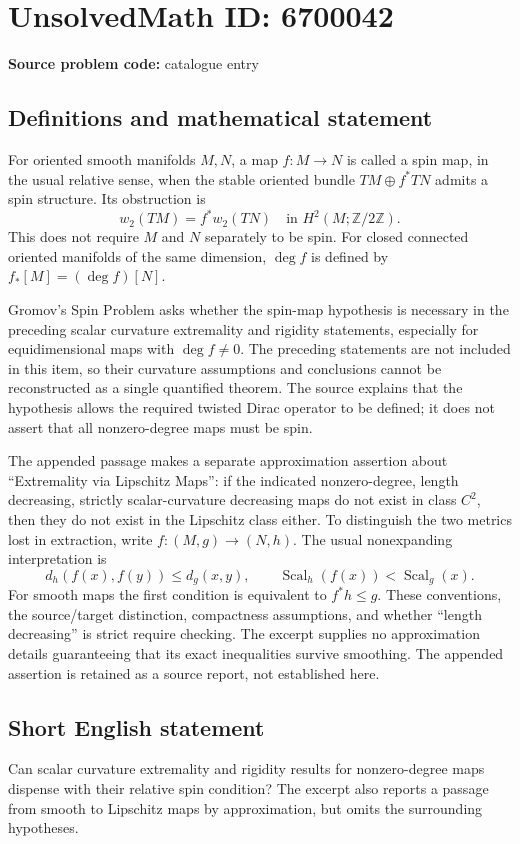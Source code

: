 \documentclass[11pt]{article}
\newcommand{\Z}{\mathbb{Z}}
\begin{document}
\section*{UnsolvedMath ID: 6700042}
\textbf{Source problem code:} catalogue entry
\subsection{Definitions and mathematical statement}
For oriented smooth manifolds \(M,N\), a map \(f:M\to N\) is called a spin map, in the usual relative sense, when the stable oriented bundle \(TM\oplus f^*TN\) admits a spin structure. Its obstruction is
\[
 w_2(TM)=f^*w_2(TN)\quad\text{in }H^2(M;\Z/2\Z).
\]
This does not require \(M\) and \(N\) separately to be spin. For closed connected oriented manifolds of the same dimension, \(\deg f\) is defined by \(f_*[M]=(\deg f)[N]\).

Gromov's Spin Problem asks whether the spin-map hypothesis is necessary in the preceding scalar curvature extremality and rigidity statements, especially for equidimensional maps with \(\deg f\ne0\). The preceding statements are not included in this item, so their curvature assumptions and conclusions cannot be reconstructed as a single quantified theorem. The source explains that the hypothesis allows the required twisted Dirac operator to be defined; it does not assert that all nonzero-degree maps must be spin.

The appended passage makes a separate approximation assertion about ``Extremality via Lipschitz Maps'': if the indicated nonzero-degree, length decreasing, strictly scalar-curvature decreasing maps do not exist in class \(C^2\), then they do not exist in the Lipschitz class either. To distinguish the two metrics lost in extraction, write \(f:(M,g)\to(N,h)\). The usual nonexpanding interpretation is
\[
 d_h(f(x),f(y))\leq d_g(x,y),\qquad
 \operatorname{Scal}_h(f(x))<\operatorname{Scal}_g(x).
\]
For smooth maps the first condition is equivalent to \(f^*h\leq g\). These conventions, the source/target distinction, compactness assumptions, and whether ``length decreasing'' is strict require checking. The excerpt supplies no approximation details guaranteeing that its exact inequalities survive smoothing. The appended assertion is retained as a source report, not established here.
\subsection{Short English statement}
Can scalar curvature extremality and rigidity results for nonzero-degree maps dispense with their relative spin condition? The excerpt also reports a passage from smooth to Lipschitz maps by approximation, but omits the surrounding hypotheses.
\end{document}
